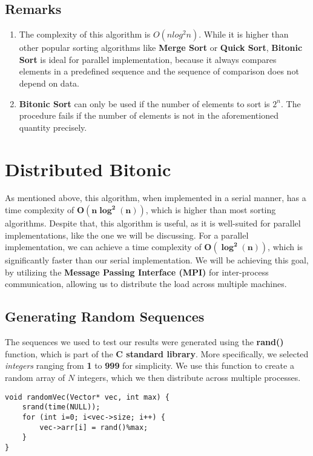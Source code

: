 \documentclass[12pt]{report}
\begin{document}
\section{Remarks}
\begin{enumerate}
\item The complexity of this algorithm is $O(nlog^2n)$. While it is higher than other popular sorting algorithms like \textbf{Merge Sort} or \textbf{Quick Sort},  \textbf{Bitonic Sort} is ideal for parallel implementation, because it always compares elements in a predefined sequence and the sequence of comparison does not depend on data. 
\item \textbf{Bitonic Sort} can only be used if the number of elements to sort is $2^n$. The procedure fails if the number of elements is not in the aforementioned quantity precisely.
\end{enumerate}
        
\chapter{Distributed Bitonic}
As mentioned above, this algorithm, when implemented in a serial manner, has a time complexity of \(\boldsymbol{O(n\log^2(n))}\), which is higher than most sorting algorithms. Despite that, this algorithm is useful, as it is well-suited for parallel implementations, like the one we will be discussing. For a parallel implementation, we can achieve a time complexity of \(\boldsymbol{O(\log^2(n))}\), which is significantly faster than our serial implementation. We will be achieving this goal, by utilizing the \textbf{Message Passing Interface (MPI)} for inter-process communication, allowing us to distribute the load across multiple machines.

\section{Generating Random Sequences}
The sequences we used to test our results were generated using the \textbf{rand()} function, which is part of the \textbf{C standard library}. More specifically, we selected \textit{integers} ranging from \textbf{1} to \textbf{999} for simplicity.  We use this function to create a random array of $N$ integers, which we then distribute across multiple processes.

\begin{lstlisting}[style=cstyle]
void randomVec(Vector* vec, int max) {
    srand(time(NULL));
    for (int i=0; i<vec->size; i++) {
        vec->arr[i] = rand()%max;
    }
}
\end{lstlisting}
\end{document}
